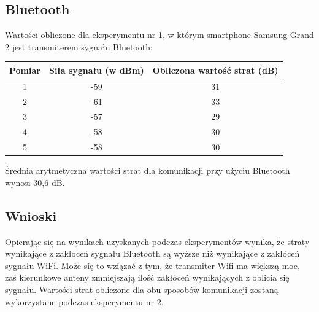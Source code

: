 \subsection{Bluetooth}
Wartości obliczone dla eksperymentu nr 1, w którym smartphone Samsung Grand 2 jest transmiterem sygnału Bluetooth:
\begin{center}
	\begin{minipage}{\linewidth}
		\begin{tabular}{|c|c|c|}
			\hline 
			Pomiar & Siła sygnału (w dBm) & Obliczona wartość strat (dB) \\ 
			\hline 
			1 & -59 & 31 \\ 
			\hline 
			2 & -61 & 33 \\ 
			\hline 
			3 & -57 & 29 \\ 
			\hline 
			4 & -58 & 30 \\ 
			\hline 
			5 & -58 & 30 \\ 
			\hline 
		\end{tabular} 
	\end{minipage} 
\end{center}
Średnia arytmetyczna wartości strat dla komunikacji przy użyciu Bluetooth wynosi 30,6 dB.
\subsection{Wnioski}
Opierając się na wynikach uzyskanych podczas eksperymentów wynika, że straty wynikające z zakłóceń sygnału Bluetooth są wyższe niż wynikające z zakłóceń sygnału WiFi. Może się to wziązać z tym, że transmiter Wifi ma większą moc, zaś kierunkowe anteny zmniejszają ilość zakłóceń wynikających z oblicia się sygnału. Wartości strat obliczone dla obu sposobów komunikacji zostaną wykorzystane podczas eksperymentu nr 2.